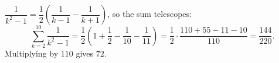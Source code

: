 $\dfrac1{k^2-1}=\dfrac12\left(\dfrac1{k-1}-\dfrac1{k+1}\right)$, so the sum telescopes:
\[\sum_{k=2}^{10}\dfrac1{k^2-1}=\dfrac12\left(1+\dfrac12-\dfrac1{10}-\dfrac1{11}\right)=\dfrac12\cdot\dfrac{110+55-11-10}{110}=\dfrac{144}{220}.\]
Multiplying by $110$ gives $\boxed{72}$.
